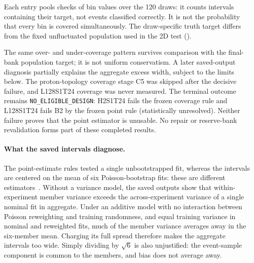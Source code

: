Each entry pools checks of bin values over the 120 draws: it counts intervals containing their target, not events classified correctly. It is not the probability that every bin is covered simultaneously. The draw-specific truth target differs from the fixed unfluctuated population used in the 2D test ().

The same over- and under-coverage pattern survives comparison with the final-bank population target; it is not uniform conservatism. A later saved-output diagnosis partially explains the aggregate excess width, subject to the limits below. The proton-topology coverage stage C5 was skipped after the decisive failure, and L128S1T24 coverage was never measured. The terminal outcome remains \texttt{NO\_ELIGIBLE\_DESIGN}: H2S1T24 fails the frozen coverage rule and L128S1T24 fails B2 by the frozen point rule (statistically unresolved). Neither failure proves that the point estimator is unusable. No repair or reserve-bank revalidation forms part of these completed results.

\paragraph{What the saved intervals diagnose.} The point-estimate rules tested a single unbootstrapped fit, whereas the intervals are centered on the mean of six Poisson-bootstrap fits: these are different estimators~\cite{PETIntervalDiagnosis2026}. Without a variance model, the saved outputs show that within-experiment member variance exceeds the across-experiment variance of a single nominal fit in aggregate. Under an additive model with no interaction between Poisson reweighting and training randomness, and equal training variance in nominal and reweighted fits, much of the member variance averages away in the six-member mean. Charging its full spread therefore makes the aggregate intervals too wide. Simply dividing by $\sqrt{6}$ is also unjustified: the event-sample component is common to the members, and bias does not average away.

